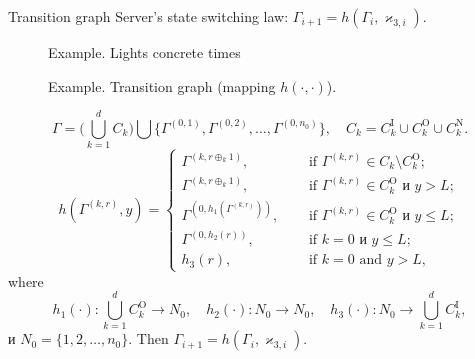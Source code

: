 \documentclass[10pt]{beamer}
\begin{document}
\begin{frame}[allowframebreaks]{Transition graph}
 Server's state switching law: $\Gamma_{i+1}=h(\Gamma_i,\varkappa_{3,i})$.
   \begin{figure}[h]
    \centering
    \caption{Example. Lights concrete times}
    \label{VK:fig:3}
  \end{figure}
   \begin{figure}[h]
    \centering
    \caption{Example. Transition graph (mapping $h(\cdot,\cdot)$).}
    \label{VK:fig:3}
  \end{figure}

  \begin{equation}
  \Gamma = \bigl( \bigcup_{k=1}^d C_k \bigr) \bigcup \{\Gamma^{(0,1)}, \Gamma^{(0,2)}, \ldots, \Gamma^{(0,n_0)}\}, \quad C_k = C_k^{\mathrm{I}} \cup C_k^{\mathrm{O}}  \cup C_k^{\mathrm{N}}.
  \end{equation}
  \begin{equation}
h(\Gamma^{(k,r)},y) = 
\begin{cases}
\Gamma^{(k,r\oplus_k 1)},& \quad \text{ if } \Gamma^{(k,r)}\in C_k\setminus C_k^{\mathrm{O}};\\
\Gamma^{(k,r\oplus_k 1)},& \quad \text{ if } \Gamma^{(k,r)}\in C_k^{\mathrm{O}} \text{ и } y>L;\\
\Gamma^{(0,h_1(\Gamma^{(k,r)}))},& \quad \text{ if } \Gamma^{(k,r)}\in C_k^{\mathrm{O}} \text{ и } y\leqslant L;\\
\Gamma^{(0,h_2(r))},& \quad \text{ if } k=0 \text{ и } y\leqslant L;\\
h_3(r),& \quad \text{ if } k=0 \text{ and } y > L,
\end{cases}
\end{equation}
where 
$$h_1(\cdot)\colon \bigcup_{k=1}^d C_k^{\mathrm{O}}\to N_0, \quad h_2(\cdot)\colon N_0\to N_0, \quad h_3(\cdot)\colon N_0 \to\bigcup_{k=1}^d C_k^{\mathrm{I}},$$ и $N_0=\{1,2, \ldots, n_0\}$.
Then 
$\Gamma_{i+1} = h(\Gamma_i, \varkappa_{3,i}).
$
\end{frame}
\end{document}
